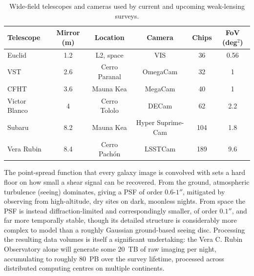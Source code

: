 \begin{table}[H]
    \centering
    \renewcommand{\arraystretch}{1.25}
    \begin{tabular}{@{}lccccc@{}}
        \toprule
        \textbf{Telescope} & \textbf{Mirror (m)} & \textbf{Location} & \textbf{Camera} & \textbf{Chips} & \textbf{FoV (deg$^2$)} \\
        \midrule
        Euclid & 1.2 & L2, space & VIS & 36 & 0.56 \\
        VST & 2.6 & Cerro Paranal & OmegaCam & 32 & 1 \\
        CFHT & 3.6 & Mauna Kea & MegaCam & 40 & 1 \\
        Victor Blanco & 4 & Cerro Tololo & DECam & 62 & 2.2 \\
        Subaru & 8.2 & Mauna Kea & Hyper Suprime-Cam & 104 & 1.8 \\
        Vera Rubin & 8.4 & Cerro Pach\'on & LSSTCam & 189 & 9.6 \\
        \bottomrule
    \end{tabular}
    \caption{Wide-field telescopes and cameras used by current and upcoming weak-lensing surveys.}
    \label{tab:wl_telescopes}
\end{table}

\vspace{-1em}

The point-spread function that every galaxy image is convolved with sets a hard floor on how small a shear signal can be recovered. From the ground, atmospheric turbulence (seeing) dominates, giving a PSF of order $0.6$-$1''$, mitigated by observing from high-altitude, dry sites on dark, moonless nights. From space the PSF is instead diffraction-limited and correspondingly smaller, of order $0.1''$, and far more temporally stable, though its detailed structure is considerably more complex to model than a roughly Gaussian ground-based seeing disc. Processing the resulting data volumes is itself a significant undertaking: the Vera C. Rubin Observatory alone will generate some $20$~TB of raw imaging per night, accumulating to roughly $80$~PB over the survey lifetime, processed across distributed computing centres on multiple continents.

\medskip


